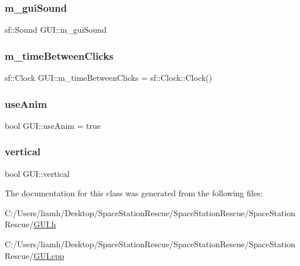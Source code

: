 \subsubsection{\texorpdfstring{m\_guiSound}{m\_guiSound}}
{\footnotesize\ttfamily sf\+::\+Sound G\+U\+I\+::m\+\_\+gui\+Sound}

\mbox{\label{class_g_u_i_a638d355db4a61b4aee3b63c98e56d213}} 
\subsubsection{\texorpdfstring{m\_timeBetweenClicks}{m\_timeBetweenClicks}}
{\footnotesize\ttfamily sf\+::\+Clock G\+U\+I\+::m\+\_\+time\+Between\+Clicks = sf\+::\+Clock\+::\+Clock()\hspace{0.3cm}{\ttfamily [static]}}

\mbox{\label{class_g_u_i_ae22a27f100774c463aea824a436c295c}} 
\subsubsection{\texorpdfstring{useAnim}{useAnim}}
{\footnotesize\ttfamily bool G\+U\+I\+::use\+Anim = true\hspace{0.3cm}{\ttfamily [static]}}

\mbox{\label{class_g_u_i_a786cc222e797d0f4c241986315b23b90}} 
\subsubsection{\texorpdfstring{vertical}{vertical}}
{\footnotesize\ttfamily bool G\+U\+I\+::vertical}



The documentation for this class was generated from the following files\+:\begin{DoxyCompactItemize}
\item 
C\+:/\+Users/liamh/\+Desktop/\+Space\+Station\+Rescue/\+Space\+Station\+Rescue/\+Space\+Station\+Rescue/\mbox{\hyperlink{_g_u_i_8h}{G\+U\+I.\+h}}\item 
C\+:/\+Users/liamh/\+Desktop/\+Space\+Station\+Rescue/\+Space\+Station\+Rescue/\+Space\+Station\+Rescue/\mbox{\hyperlink{_g_u_i_8cpp}{G\+U\+I.\+cpp}}\end{DoxyCompactItemize}
